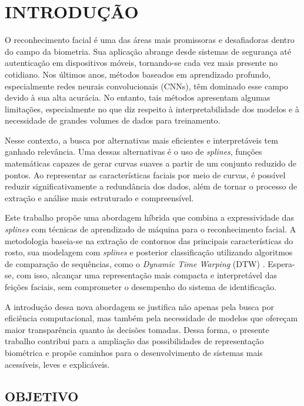 \chapter{INTRODUÇÃO} \label{cha:introd}

O reconhecimento facial é uma das áreas mais promissoras e desafiadoras dentro do campo da biometria. Sua aplicação abrange desde sistemas de segurança até autenticação em dispositivos móveis, tornando-se cada vez mais presente no cotidiano. Nos últimos anos, métodos baseados em aprendizado profundo, especialmente redes neurais convolucionais (CNNs), têm dominado esse campo devido à sua alta acurácia. No entanto, tais métodos apresentam algumas limitações, especialmente no que diz respeito à interpretabilidade dos modelos e à necessidade de grandes volumes de dados para treinamento.

Nesse contexto, a busca por alternativas mais eficientes e interpretáveis tem ganhado relevância. Uma dessas alternativas é o uso de \textit{splines}, funções matemáticas capazes de gerar curvas suaves a partir de um conjunto reduzido de pontos. Ao representar as características faciais por meio de curvas, é possível reduzir significativamente a redundância dos dados, além de tornar o processo de extração e análise mais estruturado e compreensível.

Este trabalho propõe uma abordagem híbrida que combina a expressividade das \textit{splines} com técnicas de aprendizado de máquina para o reconhecimento facial. A metodologia baseia-se na extração de contornos das principais características do rosto, sua modelagem com \textit{splines} e posterior classificação utilizando algoritmos de comparação de sequências, como o \textit{Dynamic Time Warping} (DTW) \cite{SAKOE}. Espera-se, com isso, alcançar uma representação mais compacta e interpretável das feições faciais, sem comprometer o desempenho do sistema de identificação.

A introdução dessa nova abordagem se justifica não apenas pela busca por eficiência computacional, mas também pela necessidade de modelos que ofereçam maior transparência quanto às decisões tomadas. Dessa forma, o presente trabalho contribui para a ampliação das possibilidades de representação biométrica e propõe caminhos para o desenvolvimento de sistemas mais acessíveis, leves e explicáveis.

\section{OBJETIVO}

